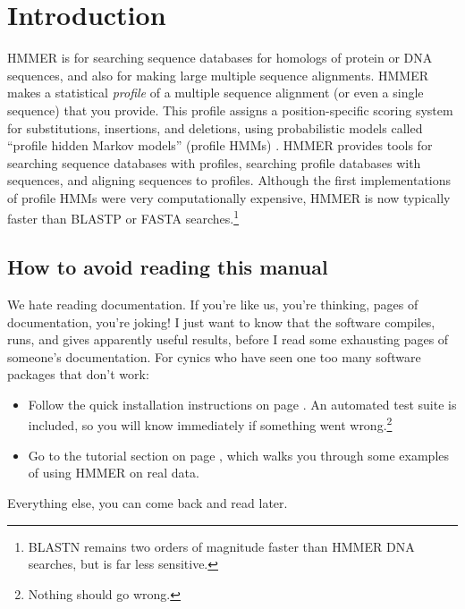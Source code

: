 \section{Introduction}
\setcounter{footnote}{0}

HMMER is for searching sequence databases for homologs of protein or
DNA sequences, and also for making large multiple sequence alignments.
HMMER makes a statistical \emph{profile} of a multiple sequence
alignment (or even a single sequence) that you provide. This profile
assigns a position-specific scoring system for substitutions,
insertions, and deletions, using probabilistic models called ``profile
hidden Markov models'' (profile HMMs) \citep{Krogh94,Eddy98,Durbin98}.
HMMER provides tools for searching sequence databases with profiles,
searching profile databases with sequences, and aligning sequences to
profiles. Although the first implementations of profile HMMs were very
computationally expensive, HMMER is now typically faster than BLASTP
or FASTA searches\citep{Eddy11}.\footnote{BLASTN remains two orders of
  magnitude faster than HMMER DNA searches, but is far less
  sensitive.}

\subsection{How to avoid reading this manual}

We hate reading documentation. If you're like us, you're thinking,
\pageref*{manualend} pages of documentation, you're joking! I just
want to know that the software compiles, runs, and gives apparently
useful results, before I read some \pageref*{manualend} exhausting
pages of someone's documentation. For cynics who have seen one too
many software packages that don't work:

\begin{itemize}

\item Follow the quick installation instructions on page
  \pageref{section:installation}. An automated test suite is included,
  so you will know immediately if something went
  wrong.\footnote{Nothing should go wrong.}

\item Go to the tutorial section on page \pageref{section:tutorial},
  which walks you through some examples of using HMMER on real data.

\end{itemize}

Everything else, you can come back and read later.



